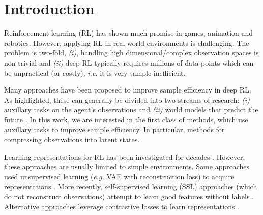 \documentclass{article}
\makeatletter
\theoremstyle{plain}
\theoremstyle{definition}
\theoremstyle{remark}
\newcommand{\eg}{\textit{e.g.\@}\xspace}
\newcommand{\ie}{\textit{i.e.\@}\xspace}
\makeatother
\begin{document}
\section{Introduction}
\label{intro}

Reinforcement learning (RL) \citep{sutton2018reinforcement} has shown much promise in games, animation and robotics.
However, applying RL in real-world environments is challenging. The problem is two-fold,
{\em (i)}, handling high dimensional/complex observation spaces is non-trivial and {\em (ii)}
deep RL typically requires millions of data points which can be unpractical (or costly), \ie it is very sample inefficient.

Many approaches have been proposed to improve sample efficiency in deep RL.
As \citet{laskinCURLContrastiveUnsupervised2020} highlighted, these can generally be divided into two streams of research:
{\em (i)} auxillary tasks on the agent's observations and {\em (ii)} world models that predict the future
\citep{haRecurrentWorldModels2018,hafnerLearning2019,hansenTemporalDifferenceLearning2022}.
In this work, we are interested in the first class of methods, which use auxillary tasks to improve sample efficiency.
In particular, methods for compressing observations into latent states.%

Learning representations for RL has been investigated for decades
\citep{abelOptimalBehaviorApproximate2016,mannorDynamicAbstractionReinforcement2004,liUnifiedTheoryState2006,andreStateAbstractionProgrammable2002,deardenAbstractionApproximateDecisiontheoretic1997,singhReinforcementLearningSoft1994,higginsDefinitionDisentangledRepresentations2018,vanhoofStableReinforcementLearning2016,watterEmbedControlLocally2015,ghoshRepresentationsStableOffPolicy2020}.
However, these approaches are usually limited to simple environments.
Some approaches used unsupervised learning (\eg VAE \citep{kingmaAutoEncoding2014} with reconstruction loss) to acquire representations
\citep{finnDeepSpatialAutoencoders2016,higginsDARLAImprovingZeroShot2017,langeAutonomousReinforcementLearning2012,watterEmbedControlLocally2015}.
More recently, self-supervised learning (SSL) approaches (which do not reconstruct observations)
attempt to learn good features without labels \cite{anandUnsupervisedStateRepresentation2019}.
Alternative approaches leverage contrastive losses to learn representations \cite{laskinCURLContrastiveUnsupervised2020}.
\end{document}
